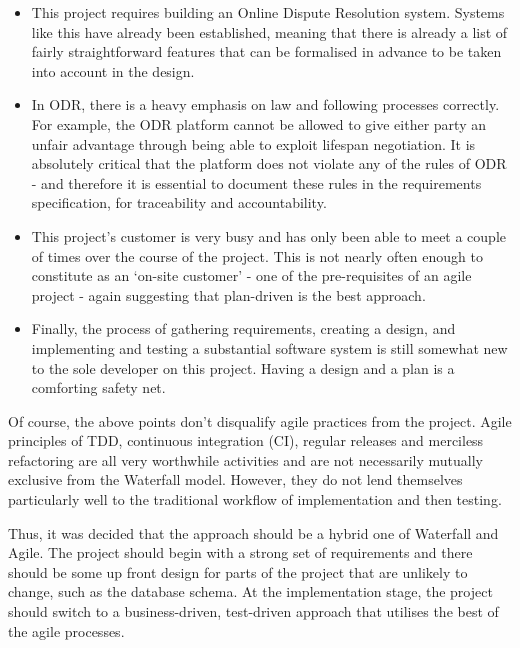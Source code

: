 \begin{itemize}

    \item This project requires building an Online Dispute Resolution system. Systems like this have already been established, meaning that there is already a list of fairly straightforward features that can be formalised in advance to be taken into account in the design.
    
    \item In ODR, there is a heavy emphasis on law and following processes correctly. For example, the ODR platform cannot be allowed to give either party an unfair advantage through being able to exploit lifespan negotiation. It is absolutely critical that the platform does not violate any of the rules of ODR - and therefore it is essential to document these rules in the requirements specification, for traceability and accountability.
    
    \item This project's customer is very busy and has only been able to meet a couple of times over the course of the project. This is not nearly often enough to constitute as an `on-site customer' - one of the pre-requisites of an agile project - again suggesting that plan-driven is the best approach.
    
    \item Finally, the process of gathering requirements, creating a design, and implementing and testing a substantial software system is still somewhat new to the sole developer on this project. Having a design and a plan is a comforting safety net.

\end{itemize}

Of course, the above points don't disqualify agile practices from the project. Agile principles of TDD, continuous integration (CI), regular releases and merciless refactoring are all very worthwhile activities and are not necessarily mutually exclusive from the Waterfall model. However, they do not lend themselves particularly well to the traditional workflow of implementation and then testing.

Thus, it was decided that the approach should be a hybrid one of Waterfall and Agile. The project should begin with a strong set of requirements and there should be some up front design for parts of the project that are unlikely to change, such as the database schema. At the implementation stage, the project should switch to a business-driven, test-driven approach that utilises the best of the agile processes.

